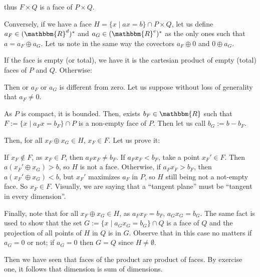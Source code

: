 \documentclass[a4paper,10pt]{article}
\newcommand{\st}{ \; \left| \right. \;}
\newcommand{\R}{\mathbbm{R}}
\begin{document}
\begin{enumerate}
    thus $F\times Q$ is a face of $P\times Q$.

    Conversely, if we have a face $H = \{ x \st a x = b\} \cap P\times Q$, let us define $a_F \in (\R^d)^*$ and $a_G\in (\R^e)^*$ as the only ones such that $a = a_F \oplus a_G$. Let us note in the same way the covectors $a_F \oplus 0$ and $ 0 \oplus a_G$.
    
    If the face is empty (or total), we have it is the cartesian product of empty (total) faces of $P$ and $Q$. Otherwise:
    
    Then or $a_F$ or $a_G$ is different from zero. Let us suppose without loss of generality that $a_F\neq0$.
    
    As $P$ is compact, it is bounded. Then, exists $b_F\in\R$ such that $F := \{x \st a_Fx = b_F\}\cap P$ is a non-empty face of $P$. Then let us call $b_G := b - b_F$.
    
    Then, for all $x_F\oplus x_G\in H$, $x_F \in F$. Let us prove it:
    
    If $x_F \notin F$, as $x_F\in P$, then $a_F x_F \neq b_F$. If $a_F x_F < b_F$, take a point $x_F'\in F$. Then $a (x_F' \oplus x_G) > b$, so $H$ is not a face. Otherwise, if $a_F x_F > b_F$, then $a (x_F' \oplus x_G) < b$, but $x_F'$ maximizes $a_F$ in $P$, so $H$ still being not a not-empty face. So $x_F \in F$. Visually, we are saying that a ``tangent plane'' must be ``tangent in every dimension''.
    
    Finally, note that for all $x_F\oplus x_G\in H$, as $a_F x_F = b_F$, $a_G x_G = b_G$. The same fact is used to show that the set $G:=\{x \st a_G x_G = b_G\}\cap Q$ is a face of $Q$ and the projection of all points of $H$ in $Q$ is in $G$. Observe that in this case no matters if $a_G = 0$ or not; if $a_G = 0$ then $G = Q$ since $H\neq \emptyset$.
    
    Then we have seen that faces of the product are product of faces. By exercise one, it follows that dimension is sum of dimensions.
    
    
    
  \end{enumerate}
\end{document}
